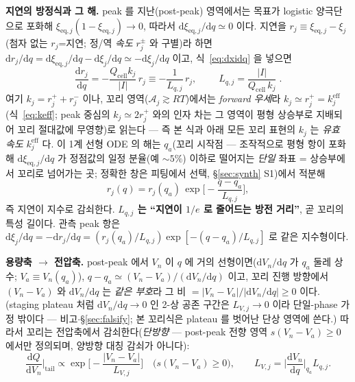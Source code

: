 \documentclass[11pt,a4paper]{article}
\newcommand{\dd}{\mathrm{d}}
\newcommand{\eff}{\mathrm{eff}}
\newcommand{\eq}{\mathrm{eq}}
\newcommand{\cell}{\mathrm{cell}}
\begin{document}
\textbf{지연의 방정식과 그 해.} peak 를 지난(post-peak) 영역에서는 목표가 logistic 양극단으로 포화해
$\xi_{\eq,j}(1-\xi_{\eq,j})\to0$, 따라서 $\dd\xi_{\eq,j}/\dd q\simeq0$ 이다. 지연을 $r_j\equiv\xi_{\eq,j}-\xi_j$
(첨자 없는 $r_j$=지연; 정/역 \emph{속도} $r_j^\pm$ 와 구별)라 하면 $\dd r_j/\dd q=\dd\xi_{\eq,j}/\dd q-\dd\xi_j/\dd q\simeq-\dd\xi_j/\dd q$ 이고, 식~\eqref{eq:dxidq} 을
넣으면
\begin{equation}
\frac{\dd r_j}{\dd q}=-\frac{Q_\cell k_j}{|I|}\,r_j\equiv-\frac{1}{L_{q,j}}\,r_j,\qquad
\boxed{\;L_{q,j}=\frac{|I|}{Q_\cell\,k_j}\;}.
\label{eq:Lq}
\end{equation}
여기 $k_j=r_j^++r_j^-$ 이나, 꼬리 영역($\mathcal A_j\gtrsim RT$)에서는 \emph{forward 우세}라 $k_j\simeq r_j^+=k_j^\eff$
(식~\eqref{eq:keff}; peak 중심의 $k_j\simeq2r_j^+$ 와의 인자 차는 그 영역이 평형 상승부로 지배되어 꼬리 절대값에
무영향)로 읽는다 — 즉 본 식과 아래 모든 꼬리 표현의 $k_j$ 는 \emph{유효 속도} $k_j^\eff$ 다.
이 1계 선형 ODE 의 해는 $q_a$(꼬리 시작점 — 조작적으로 평형 항이 포화해 $\dd\xi_{\eq,j}/\dd q$ 가 정점값의 일정
분율(예 $\sim5\%$) 이하로 떨어지는 \emph{단일} 좌표 = 상승부에서 꼬리로 넘어가는 곳; 정확한 창은 피팅에서 선택, \S\ref{sec:synth} S1)에서 적분해
\begin{equation}
r_j(q)=r_j(q_a)\,\exp\!\Big[-\frac{q-q_a}{L_{q,j}}\Big],
\label{eq:rsol}
\end{equation}
즉 지연이 지수로 감쇠한다. \textbf{$L_{q,j}$ 는 ``지연이 $1/e$ 로 줄어드는 방전 거리''}, 곧 꼬리의 특성 길이다.
관측 peak 항은 $\dd\xi_j/\dd q=-\dd r_j/\dd q=(r_j(q_a)/L_{q,j})\exp[-(q-q_a)/L_{q,j}]$ 로 같은 지수형이다.

\textbf{용량축 $\to$ 전압축.} post-peak 에서 $V_n$ 이 $q$ 에 거의 선형이면($\dd V_n/\dd q$ 가 $q_a$ 둘레 상수;
$V_a\equiv V_n(q_a)$), $q-q_a\simeq(V_n-V_a)/(\dd V_n/\dd q)$ 이고, 꼬리 진행 방향에서 $(V_n-V_a)$ 와 $\dd V_n/\dd q$
는 \emph{같은 부호}라 그 비 $=|V_n-V_a|/|\dd V_n/\dd q|\ge0$ 이다. (staging plateau 처럼 $\dd V_n/\dd q\to0$ 인 2-상
공존 구간은 $L_{V,j}\to0$ 이라 단일-phase 가정 밖이다 — 비고$\cdot$\S\ref{sec:falsify}; 본 꼬리식은 plateau 를
벗어난 단상 영역에 쓴다.) 따라서 꼬리는 전압축에서 감쇠한다(\emph{단방향}
— post-peak 전향 영역 $s(V_n-V_a)\ge0$ 에서만 정의되며, 양방향 대칭 감쇠가 아니다):
\begin{equation}
\frac{\dd Q}{\dd V_n}\Big|_{\text{tail}}\propto\exp\!\Big[-\frac{|V_n-V_a|}{L_{V,j}}\Big]\quad\big(s(V_n-V_a)\ge0\big),\qquad
L_{V,j}=\Big|\frac{\dd V_n}{\dd q}\Big|_{q_a}L_{q,j}.
\label{eq:tail}
\end{equation}
\end{document}
